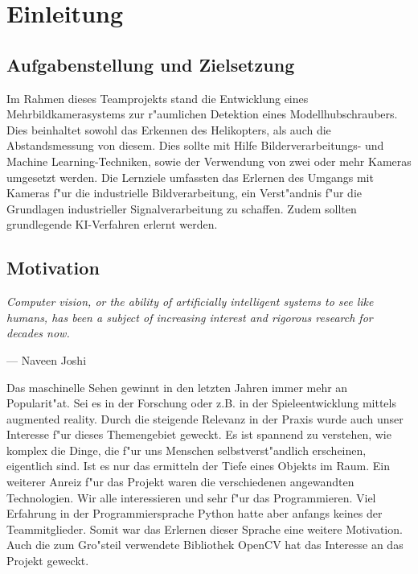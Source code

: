 \chapter{Einleitung}
\label{cha:einleitung}

\section{Aufgabenstellung und Zielsetzung}
\label {sec:aufgabenstellungzielsetzung}

Im Rahmen dieses Teamprojekts stand die Entwicklung eines Mehrbildkamerasystems zur r"aumlichen Detektion eines Modellhubschraubers. Dies beinhaltet sowohl das Erkennen des Helikopters, als auch die Abstandsmessung von diesem.\newline
Dies sollte mit Hilfe Bilderverarbeitungs- und Machine Learning-Techniken, sowie der Verwendung von zwei oder mehr Kameras umgesetzt werden.\newline
Die Lernziele umfassten das Erlernen des Umgangs mit Kameras f"ur die industrielle Bildverarbeitung, ein Verst"andnis f"ur die Grundlagen industrieller Signalverarbeitung zu schaffen. Zudem sollten grundlegende KI-Verfahren erlernt werden.\newline

\section{Motivation}
\label {sec:motivation}

\setlength\epigraphwidth{15cm}
\setlength\epigraphrule{0pt}

\epigraph{\textit{\glqq Computer vision, or the ability of artificially intelligent systems to see like humans, has been a subject of increasing interest and rigorous research for decades now.\grqq{}}}{--- \textup{}Naveen Joshi\cite{Nj}\\}

Das maschinelle Sehen gewinnt in den letzten Jahren immer mehr an Popularit"at. Sei es in der Forschung oder z.B. in der Spieleentwicklung mittels augmented reality.\newline
Durch die steigende Relevanz in der Praxis wurde auch unser Interesse f"ur dieses Themengebiet geweckt. Es ist spannend zu verstehen, wie komplex die Dinge, die f"ur uns Menschen selbstverst"andlich erscheinen, eigentlich sind. Ist es nur das ermitteln der Tiefe eines Objekts im Raum.\newline
Ein weiterer Anreiz f"ur das Projekt waren die verschiedenen angewandten Technologien. Wir alle interessieren und sehr f"ur das Programmieren. Viel Erfahrung in der Programmiersprache Python hatte aber anfangs keines der Teammitglieder. Somit war das Erlernen dieser Sprache eine weitere Motivation.\newline
Auch die zum Gro"steil verwendete Bibliothek OpenCV hat das Interesse an das Projekt geweckt.

